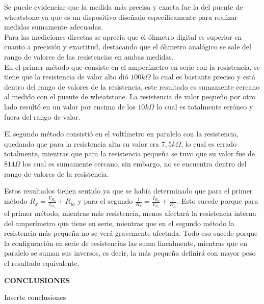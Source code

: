 \documentclass[12pt]{article}
\begin{document}
	\noindent Se puede evidenciar que la medida más precisa y exacta fue la del puente de wheatstone ya que es un dispositivo diseñado específicamente para realizar medidas sumamente adecuadas.\\
	
	\noindent Para las mediciones directas se aprecia que el óhmetro digital es superior en cuanto a precisión y exactitud, destacando que el óhmetro analógico se sale del rango de valores de las resistencias en ambas medidas.\\
	
	\noindent En el primer método que consiste en el amperímetro en serie con la resistencia, se tiene que la resistencia de valor alto dió $100k\Omega$ lo cual es bastante preciso y está dentro del rango de valores de la resistencia, este resultado es sumamente cercano al medido con el puente de wheatstone. La resistencia de valor pequeño por otro lado resultó en un valor por encima de los $10k\Omega$ lo cual es totalmente erróneo y fuera del rango de valor.
	
	\noindent El segundo método consistió en el voltímetro en paralelo con la resistencia, quedando que para la resistencia alta su valor era $7,5k\Omega$, lo cual es errado totalmente, mientras que para la resistencia pequeña se tuvo que su valor fue de $814\Omega$ los cual es sumamente cercano, sin embargo, no se encuentra dentro del rango de valores de la resistencia.
	
	\noindent Estos resultados tienen sentido ya que se había determinado que para el primer método $R_x = \frac{V_{R_x}}{I_{R_x}} + R_{ia}$ y para el segundo $\frac{1}{R_x} = \frac{I_{R_x}}{V_{R_x}} + \frac{1}{R_{iv}}$. Esto sucede porque para el primer método, mientras más resistencia, menos afectará la resistencia interna del amperímetro que tiene en serie, mientras que en el segundo método la resistencia más pequeña no se verá gravemente afectada. Todo eso sucede porque la configuración en serie de resistencias las suma linealmente, mientras que en paralelo se suman sus inversos, es decir, la más pequeña definirá con mayor peso el resultado equivalente.\\
	
	\newpage
	
	\begin{center}
		\textbf{\large CONCLUSIONES}\\
	\end{center}
	
	Inserte conclusiones
	
	\newpage
	
\end{document}
